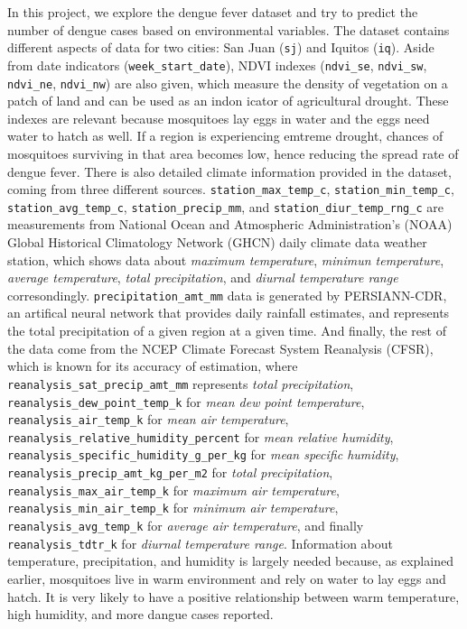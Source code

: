 \documentclass[11pt]{article}
\begin{document}
In this project, we explore the dengue fever dataset and try to predict
the number of dengue cases based on environmental variables. The dataset
contains different aspects of data for two cities: San Juan
(\texttt{sj}) and Iquitos (\texttt{iq}). Aside from date indicators
(\texttt{week\_start\_date}), NDVI indexes (\texttt{ndvi\_se},
\texttt{ndvi\_sw}, \texttt{ndvi\_ne}, \texttt{ndvi\_nw}) are also given,
which measure the density of vegetation on a patch of land and can be
used as an indon icator of agricultural drought. These indexes are
relevant because mosquitoes lay eggs in water and the eggs need water to
hatch as well. If a region is experiencing emtreme drought, chances of
mosquitoes surviving in that area becomes low, hence reducing the spread
rate of dengue fever. There is also detailed climate information
provided in the dataset, coming from three different sources.
\texttt{station\_max\_temp\_c}, \texttt{station\_min\_temp\_c},
\texttt{station\_avg\_temp\_c}, \texttt{station\_precip\_mm}, and
\texttt{station\_diur\_temp\_rng\_c} are measurements from National
Ocean and Atmospheric Administration's (NOAA) Global Historical
Climatology Network (GHCN) daily climate data weather station, which
shows data about \emph{maximum temperature}, \emph{minimun temperature},
\emph{average temperature}, \emph{total precipitation}, and
\emph{diurnal temperature range} corresondingly.
\texttt{precipitation\_amt\_mm} data is generated by PERSIANN-CDR, an
artifical neural network that provides daily rainfall estimates, and
represents the total precipitation of a given region at a given time.
And finally, the rest of the data come from the NCEP Climate Forecast
System Reanalysis (CFSR), which is known for its accuracy of estimation,
where \texttt{reanalysis\_sat\_precip\_amt\_mm} represents \emph{total
precipitation}, \texttt{reanalysis\_dew\_point\_temp\_k} for \emph{mean
dew point temperature}, \texttt{reanalysis\_air\_temp\_k} for \emph{mean
air temperature}, \texttt{reanalysis\_relative\_humidity\_percent} for
\emph{mean relative humidity},
\texttt{reanalysis\_specific\_humidity\_g\_per\_kg} for \emph{mean
specific humidity}, \texttt{reanalysis\_precip\_amt\_kg\_per\_m2} for
\emph{total precipitation}, \texttt{reanalysis\_max\_air\_temp\_k} for
\emph{maximum air temperature}, \texttt{reanalysis\_min\_air\_temp\_k}
for \emph{minimum air temperature}, \texttt{reanalysis\_avg\_temp\_k}
for \emph{average air temperature}, and finally
\texttt{reanalysis\_tdtr\_k} for \emph{diurnal temperature range}.
Information about temperature, precipitation, and humidity is largely
needed because, as explained earlier, mosquitoes live in warm
environment and rely on water to lay eggs and hatch. It is very likely
to have a positive relationship between warm temperature, high humidity,
and more dangue cases reported.
\end{document}
